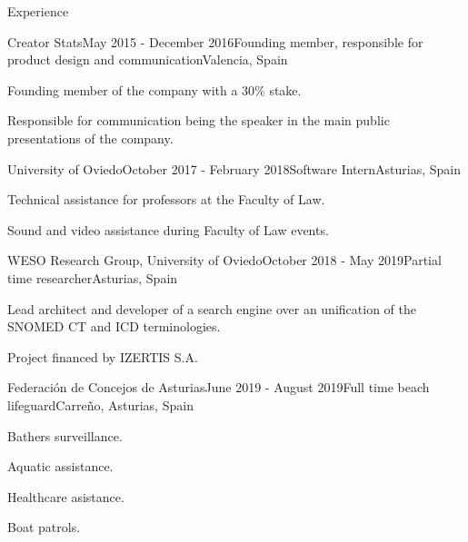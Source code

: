 \documentclass{resume} %
\begin{document}
\begin{rSection}{Experience}

\begin{rSubsection}{Creator Stats}{May 2015 - December 2016}{Founding member, responsible for product design and communication}{Valencia, Spain}
\item Founding member of the company with a 30\% stake.
\item Responsible for communication being the speaker in the main public presentations of the company.
\end{rSubsection}


\begin{rSubsection}{University of Oviedo}{October 2017 - February 2018}{Software Intern}{Asturias, Spain}
    \item Technical assistance for professors at the Faculty of Law.
    \item Sound and video assistance during Faculty of Law events.
    \end{rSubsection}


\begin{rSubsection}{WESO Research Group, University of Oviedo}{October 2018 - May 2019}{Partial time researcher}{Asturias, Spain}
    \item Lead architect and developer of a search engine over an unification of the SNOMED CT and ICD terminologies.
    \item Project financed by IZERTIS S.A.
    \end{rSubsection}


\begin{rSubsection}{Federación de Concejos de Asturias}{June 2019 - August 2019}{Full time beach lifeguard}{Carreño, Asturias, Spain}
    \item Bathers surveillance.
    \item Aquatic assistance.
    \item Healthcare asistance. 
    \item Boat patrols.
    \end{rSubsection}



\end{rSection}
\end{document}
